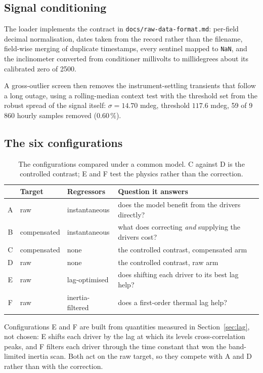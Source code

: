 \documentclass[11pt,a4paper]{article}
\begin{document}
\subsection{Signal conditioning}
\label{sec:screen}

The loader implements the contract in \texttt{docs/raw-data-format.md}: per-field
decimal normalisation, dates taken from the record rather than the filename, field-wise
merging of duplicate timestamps, every sentinel mapped to \texttt{NaN}, and the
inclinometer converted from conditioner millivolts to millidegrees about its calibrated
zero of 2500.

A gross-outlier screen then removes the instrument-settling transients that follow a
long outage, using a rolling-median context test with the threshold set from the robust
spread of the signal itself: $\sigma = 14.70$ mdeg, threshold $117.6$ mdeg, 59 of
9\,860 hourly samples removed ($0.60\,\%$).

\subsection{The six configurations}

\begin{table}[H]
\centering
\caption{The configurations compared under a common model. C against D is the
controlled contrast; E and F test the physics rather than the correction.}
\small
\begin{tabular}{@{}c l l L{6.0cm}@{}}
\toprule
& \textbf{Target} & \textbf{Regressors} & \textbf{Question it answers}\\
\midrule
A & raw & instantaneous & does the model benefit from the drivers directly?\\
B & compensated & instantaneous & what does correcting \emph{and} supplying the drivers cost?\\
C & compensated & none & the controlled contrast, compensated arm\\
D & raw & none & the controlled contrast, raw arm\\
E & raw & lag-optimised & does shifting each driver to its best lag help?\\
F & raw & inertia-filtered & does a first-order thermal lag help?\\
\bottomrule
\end{tabular}
\end{table}

Configurations E and F are built from quantities measured in Section~\ref{sec:lag},
not chosen: E shifts each driver by the lag at which its levels cross-correlation
peaks, and F filters each driver through the time constant that won the band-limited
inertia scan. Both act on the raw target, so they compete with A and D rather than with
the correction.
\end{document}
